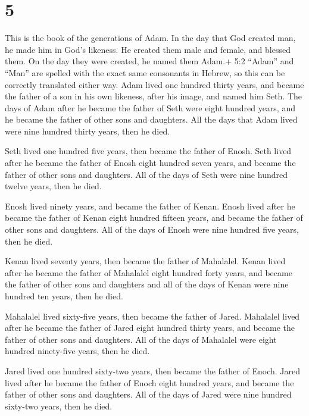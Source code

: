 \hypertarget{section-4}{%
\section{5}\label{section-4}}

 This is the book of the generations of Adam. In the day
that God created man, he made him in God's likeness.  He
created them male and female, and blessed them. On the day they were
created, he named them Adam.+ 5:2 ``Adam'' and ``Man'' are spelled with
the exact same consonants in Hebrew, so this can be correctly translated
either way.  Adam lived one hundred thirty years, and became
the father of a son in his own likeness, after his image, and named him
Seth.  The days of Adam after he became the father of Seth
were eight hundred years, and he became the father of other sons and
daughters.  All the days that Adam lived were nine hundred
thirty years, then he died.

 Seth lived one hundred five years, then became the father
of Enosh.  Seth lived after he became the father of Enosh
eight hundred seven years, and became the father of other sons and
daughters.  All of the days of Seth were nine hundred twelve
years, then he died.

 Enosh lived ninety years, and became the father of Kenan.
 Enosh lived after he became the father of Kenan eight
hundred fifteen years, and became the father of other sons and
daughters.  All of the days of Enosh were nine hundred five
years, then he died.

 Kenan lived seventy years, then became the father of
Mahalalel.  Kenan lived after he became the father of
Mahalalel eight hundred forty years, and became the father of other sons
and daughters  and all of the days of Kenan were nine
hundred ten years, then he died.

 Mahalalel lived sixty-five years, then became the father
of Jared.  Mahalalel lived after he became the father of
Jared eight hundred thirty years, and became the father of other sons
and daughters.  All of the days of Mahalalel were eight
hundred ninety-five years, then he died.

 Jared lived one hundred sixty-two years, then became the
father of Enoch.  Jared lived after he became the father of
Enoch eight hundred years, and became the father of other sons and
daughters.  All of the days of Jared were nine hundred
sixty-two years, then he died.

